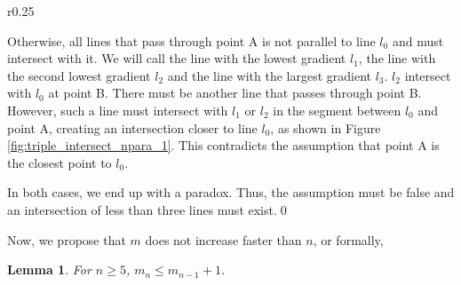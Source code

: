 \documentclass[a4paper, 12pt]{article}
\def\mypindent{1.35cm}
\newenvironment{my_indent}
 {\par\begingroup\leftskip\mypindent}
 {\par\endgroup}
\newcommand{\mycorf}{
    \leftskip-\mypindent
    \captionsetup{margin={-\mypindent,\mypindent}}}
\newtheorem{lemma}[theorem]{Lemma}
\begin{document}
\begin{my_indent}
\begin{wrapfigure}{r}{0.25\textwidth}
    \mycorf
    
    \caption{Contradicting points as a result of the assumption}
    \label{fig:triple_intersect_npara_1}
\end{wrapfigure}
Otherwise, all lines that pass through point A is not parallel to line $l_0$ and must intersect with it. We will call the line with the lowest gradient $l_1$, the line with the second lowest gradient $l_2$ and the line with the largest gradient $l_3$. $l_2$ intersect with $l_0$ at point B. There must be another line that passes through point B. However, such a line must intersect with $l_1$ or $l_2$ in the segment between $l_0$ and point A, creating an intersection closer to line $l_0$, as shown in Figure \ref{fig:triple_intersect_npara_1}. This contradicts the assumption that point A is the closest point to $l_0$.

In both cases, we end up with a paradox. Thus, the assumption must be false and an intersection of less than three lines must exist.\qed
\end{my_indent}

Now, we propose that $m$ does not increase faster than $n$, or formally,

\begin{lemma}
\label{theorem:increment}
For $n\geq5$, $m_n\leq m_{n-1}+1$.
\end{lemma}
\end{document}
